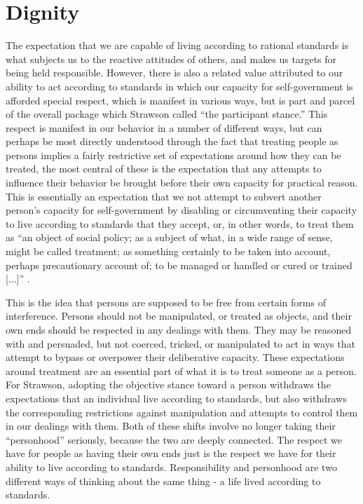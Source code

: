 \documentclass[phd,12pt,oneside,paper=letterpaper]{ubcthesis}
\begin{document}
\section{Dignity}
The expectation that we are capable of living according to rational standards is what subjects us to the reactive attitudes of others, and makes us targets for being held responsible. However, there is also a related value attributed to our ability to act according to standards in which our capacity for self-government is afforded special respect, which is manifest in various ways, but is part and parcel of the overall package which Strawson called ``the participant stance.'' This respect is manifest in our behavior in a number of different ways, but can perhaps be most directly understood through the fact that treating people as persons implies a fairly restrictive set of expectations around how they can be treated, the most central of these is the expectation that any attempts to influence their behavior be brought before their own capacity for practical reason. This is essentially an expectation that we not attempt to subvert another person's capacity for self-government by disabling or circumventing their capacity to live according to standards that they accept, or, in other words, to treat them as ``an object of social policy; as a subject of what, in a wide range of sense, might be called treatment; as something certainly to be taken into account, perhaps precautionary account of; to be managed or handled or cured or trained [...]'' \citep[p.9]{strawsonp1974}.

This is the idea that persons are supposed to be free from certain forms of interference. Persons should not be manipulated, or treated as objects, and their own ends should be respected in any dealings with them. They may be reasoned with and persuaded, but not coerced, tricked, or manipulated to act in ways that attempt to bypass or overpower their deliberative capacity. These expectations around treatment are an essential part of what it is to treat someone as a person. For Strawson, adopting the objective stance toward a person withdraws the expectations that an individual live according to standards, but also withdraws the corresponding restrictions against manipulation and attempts to control them in our dealings with them. Both of these shifts involve no longer taking their ``personhood'' seriously, because the two are deeply connected. The respect we have for people as having their own ends just is the respect we have for their ability to live according to standards. Responsibility and personhood are two different ways of thinking about the same thing - a life lived according to standards. 
\end{document}
